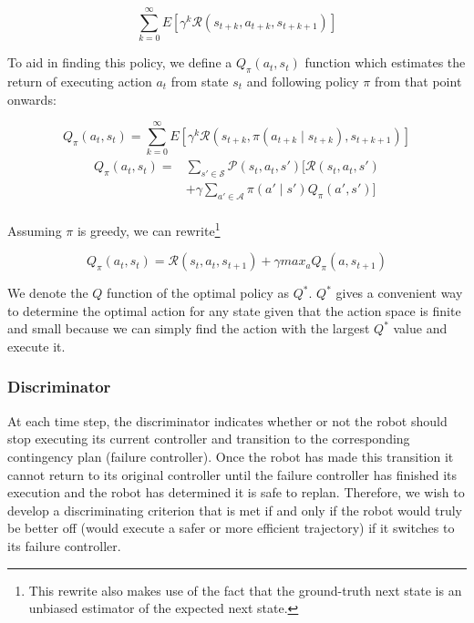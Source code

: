 \documentclass[letterpaper]{article}
\begin{document}
				\begin{equation}\label{eq:discountedreturn}
					\sum_{k=0}^{\infty}E[\gamma^k \mathcal{R}(s_{t+k}, a_{t+k}, s_{t+k+1})]
				\end{equation}
				
				To aid in finding this policy, we define a $Q_{\pi}(a_t, s_t)$ function which estimates the return of executing action $a_t$ from state $s_t$ and following policy $\pi$ from that point onwards:
				
				\begin{equation}\label{eq:q}
					Q_{\pi}(a_t, s_t) = 
					\sum_{k=0}^{\infty}E[\gamma^k \mathcal{R}(s_{t+k}, \pi(a_{t+k} \mid s_{t+k}), s_{t+k+1})]
				\end{equation}
				\begin{align}
					\begin{split}\label{eq:bellmanexpect}
						Q_{\pi}(a_t, s_t) =& 
						\sum_{s'\in \mathcal{S}}\mathcal{P}(s_t, a_t, s')[\mathcal{R}(s_t, a_t, s') \\
						&+ \gamma \sum_{a'\in \mathcal{A}}\pi(a'\mid s')Q_{\pi}(a', s')]
					\end{split}
				\end{align}
				
				Assuming $\pi$ is greedy, we can rewrite\footnote{This rewrite also makes use of the fact that the ground-truth next state is an unbiased estimator of the expected next state.}
				
				\begin{equation}\label{eq:simplebellmanexpect}
					Q_{\pi}(a_t, s_t) = \mathcal{R}(s_t, a_t, s_{t+1}) + \gamma max_a Q_{\pi}(a, s_{t+1})
				\end{equation}
				
				We denote the $Q$ function of the optimal policy as $Q^*$. $Q^*$ gives a convenient way to determine the optimal action for any state given that the action space is finite and small because we can simply find the action with the largest $Q^*$ value and execute it.
				
			\subsubsection{Discriminator}
				At each time step, the discriminator indicates whether or not the robot should stop executing its current controller and transition to the corresponding contingency plan (failure controller). Once the robot has made this transition it cannot return to its original controller until the failure controller has finished its execution and the robot has determined it is safe to replan. Therefore, we wish to develop a discriminating criterion that is met if and only if the robot would truly be better off (would execute a safer or more efficient trajectory) if it switches to its failure controller.
				
\end{document}
